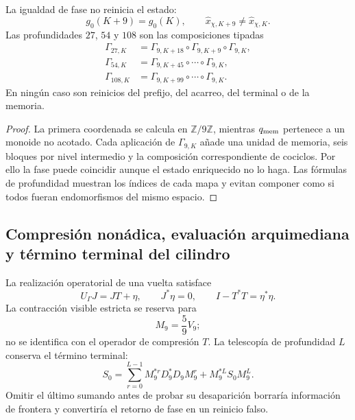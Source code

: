\begin{theorem}
\label{gfp:b:thm:retorno-fase-conservacion-genealogica}
La igualdad de fase no reinicia el estado:
\[
 g_0(K+9)=g_0(K),
 \qquad
 \widehat x_{\chi,K+9}\ne\widehat x_{\chi,K}.
\]
Las profundidades \(27\), \(54\) y \(108\) son las composiciones tipadas
\begin{align*}
 \Gamma_{27,K}
 &=\Gamma_{9,K+18}\circ\Gamma_{9,K+9}\circ\Gamma_{9,K},\\
 \Gamma_{54,K}
 &=\Gamma_{9,K+45}\circ\cdots\circ\Gamma_{9,K},\\
 \Gamma_{108,K}
 &=\Gamma_{9,K+99}\circ\cdots\circ\Gamma_{9,K}.
\end{align*}
En ningún caso son reinicios del prefijo, del acarreo, del terminal o de la
memoria.
\end{theorem}

\begin{proof}
La primera coordenada se calcula en \(\mathbb Z/9\mathbb Z\), mientras
\(q_{\rm mem}\) pertenece a un monoide no acotado. Cada aplicación de
\(\Gamma_{9,K}\) añade una unidad de memoria, seis bloques por nivel
intermedio y la composición correspondiente de cociclos. Por ello la fase
puede coincidir aunque el estado enriquecido no lo haga. Las fórmulas de
profundidad muestran los índices de cada mapa y evitan componer como si todos
fueran endomorfismos del mismo espacio.
\end{proof}

\subsection{Compresión nonádica, evaluación arquimediana y término terminal del cilindro}

La realización operatorial de una vuelta satisface
\begin{equation}
 U_\Gamma J=JT+\eta,
 \qquad
 J^*\eta=0,
 \qquad
 I-T^*T=\eta^*\eta.
 \label{gfp:b:eq:compresion-expresion-precision}
\end{equation}
La contracción visible estricta se reserva para
\[
 M_9=\frac59V_9;
\]
no se identifica con el operador de compresión \(T\). La telescopía de
profundidad \(L\) conserva el término terminal:
\begin{equation}
 S_0=
 \sum_{r=0}^{L-1}M_9^{*r}D_9^*D_9M_9^r
 +M_9^{*L}S_0M_9^L.
 \label{gfp:b:eq:telescopia-terminal-precision}
\end{equation}
Omitir el último sumando antes de probar su desaparición borraría
información de frontera y convertiría el retorno de fase en un reinicio
falso.

